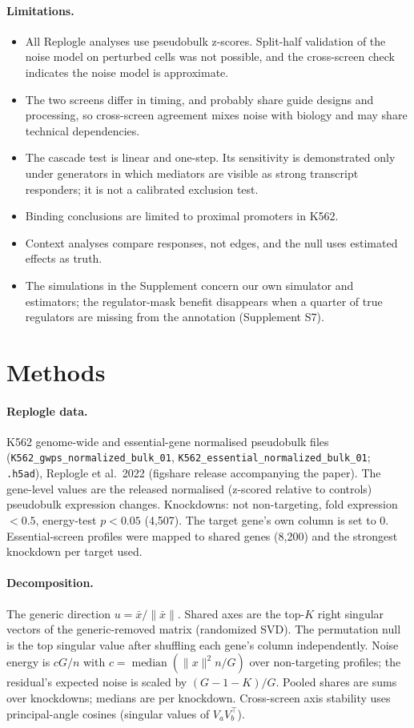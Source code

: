 \documentclass[10pt]{article}
\begin{document}
\paragraph{Limitations.}
\begin{itemize}
\item All Replogle analyses use pseudobulk z-scores. Split-half validation of the noise model on perturbed cells was not possible, and the cross-screen check indicates the noise model is approximate.
\item The two screens differ in timing, and probably share guide designs and processing, so cross-screen agreement mixes noise with biology and may share technical dependencies.
\item The cascade test is linear and one-step. Its sensitivity is demonstrated only under generators in which mediators are visible as strong transcript responders; it is not a calibrated exclusion test.
\item Binding conclusions are limited to proximal promoters in K562.
\item Context analyses compare responses, not edges, and the null uses estimated effects as truth.
\item The simulations in the Supplement concern our own simulator and estimators; the regulator-mask benefit disappears when a quarter of true regulators are missing from the annotation (Supplement S7).
\end{itemize}

\section{Methods}
\paragraph{Replogle data.} K562 genome-wide and essential-gene normalised pseudobulk files (\texttt{K562\_gwps\_normalized\_bulk\_01}, \texttt{K562\_essential\_normalized\_bulk\_01}; \texttt{.h5ad}), Replogle et al.\ 2022 (figshare release accompanying the paper). The gene-level values are the released normalised (z-scored relative to controls) pseudobulk expression changes.
Knockdowns: not non-targeting, fold expression $<0.5$, energy-test $p<0.05$ (4{,}507). The target gene's own column is set to 0.
Essential-screen profiles were mapped to shared genes (8{,}200) and the strongest knockdown per target used.
\paragraph{Decomposition.} The generic direction $u=\bar x/\|\bar x\|$. Shared axes are the top-$K$ right singular vectors of the generic-removed matrix (randomized SVD). The permutation null is the top singular value after shuffling each gene's column independently.
Noise energy is $cG/n$ with $c=\operatorname{median}(\|x\|^2 n/G)$ over non-targeting profiles; the residual's expected noise is scaled by $(G-1-K)/G$.
Pooled shares are sums over knockdowns; medians are per knockdown. Cross-screen axis stability uses principal-angle cosines (singular values of $V_aV_b^\top$).
\end{document}
